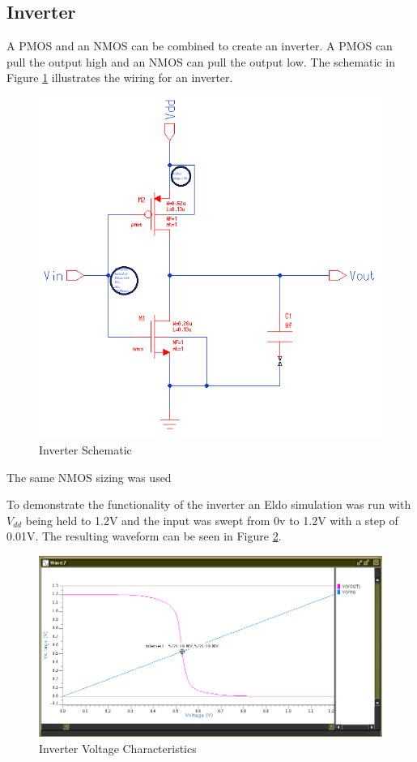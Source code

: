 \documentclass[11pt]{article}
\begin{document}
	\subsection{Inverter}
	
		A PMOS and an NMOS can be combined to create an inverter. A PMOS can pull the output high and an NMOS can pull the output low. The schematic in Figure \ref{fig:inverter-schematic} illustrates the wiring for an inverter.
	
		\begin{figure}[H]
			\centering
			\includegraphics[width=0.7\linewidth]{"Pictures/Inverter Schematic"}
			\caption[Inverter Schematic]{Inverter Schematic}
			\label{fig:inverter-schematic}
		\end{figure}
	
		The same NMOS sizing was used
	
		To demonstrate the functionality of the inverter an Eldo simulation was run with $V_{dd}$ being held to 1.2V and the input was swept from 0v to 1.2V with a step of 0.01V. The resulting waveform can be seen in Figure \ref{fig:inverter-waveform}.

		\begin{figure}[H]
			\centering
			\includegraphics[width=0.7\linewidth]{"Pictures/Inverter Waveform"}
			\caption[Inverter Voltage Characteristics]{Inverter Voltage Characteristics}
			\label{fig:inverter-waveform}
		\end{figure}
	
\end{document}
